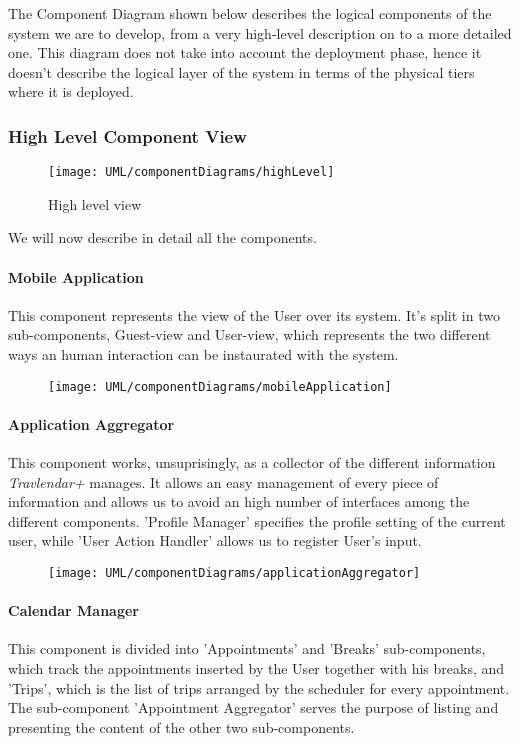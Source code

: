 The Component Diagram shown below describes the logical components of the system we are to develop, from a very high-level description on to a more detailed one. This diagram does not take into account the deployment phase, hence it doesn’t describe the logical layer of the system in terms of the physical tiers where it is deployed.

\subsubsection{High Level Component View}

	\begin{figure}[H]
			\centering
			\texttt{[image: UML/componentDiagrams/highLevel]}
			\caption{High level view}
			\label{componentHighLevel}
		\end{figure}

	We will now describe in detail all the components.

	\paragraph{Mobile Application}
		This component represents the view of the User over its system. It’s split in two sub-components, Guest-view and User-view, which represents the two different ways an human interaction can be instaurated with the system.

		\begin{figure}[H]
			\centering
			\texttt{[image: UML/componentDiagrams/mobileApplication]}
		\end{figure}


	\paragraph{Application Aggregator}
		This component works, unsuprisingly, as a collector of the different information \textit{Travlendar+} manages. It allows an easy management of every piece of information and allows us to avoid an high number of interfaces among the different components. 'Profile Manager' specifies the profile setting of the current user, while 'User Action Handler' allows us to register User's input.
	
		\begin{figure}[H]
			\centering
			\texttt{[image: UML/componentDiagrams/applicationAggregator]}
		\end{figure}
 
	\paragraph{Calendar Manager}
		This component is divided into 'Appointments' and 'Breaks' sub-components, which track the appointments inserted by the User together with his breaks, and 'Trips', which is the list of trips arranged by the scheduler for every appointment. The sub-component 'Appointment Aggregator' serves the purpose of listing and presenting the content of the other two sub-components.
	
